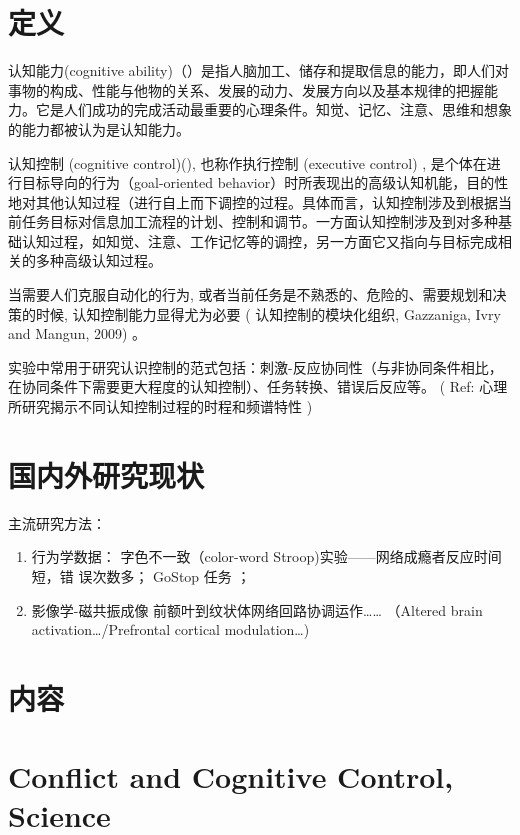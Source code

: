 \color{magenta}

\section{定义}
认知能力(cognitive ability)（\cite{}）是指人脑加工、储存和提取信息的能力，即人们对事物的构成、性能与他物的关系、发展的动力、发展方向以及基本规律的把握能力。它是人们成功的完成活动最重要的心理条件。知觉、记忆、注意、思维和想象的能力都被认为是认知能力。
                
 认知控制 (cognitive control)(\cite{}), 也称作执行控制 (executive control) , 是个体在进行目标导向的行为（goal-oriented behavior）时所表现出的高级认知机能，目的性地对其他认知过程（进行自上而下调控的过程。具体而言，认知控制涉及到根据当前任务目标对信息加工流程的计划、控制和调节。一方面认知控制涉及到对多种基础认知过程，如知觉、注意、工作记忆等的调控，另一方面它又指向与目标完成相关的多种高级认知过程。

当需要人们克服自动化的行为, 或者当前任务是不熟悉的、危险的、需要规划和决策的时候, 认知控制能力显得尤为必要 (\cite{Gazzanigaetal2009} 认知控制的模块化组织,  Gazzaniga, Ivry and Mangun, 2009) 。
	
实验中常用于研究认识控制的范式包括：刺激-反应协同性（与非协同条件相比，在协同条件下需要更大程度的认知控制）、任务转换、错误后反应等。   ( Ref: 心理所研究揭示不同认知控制过程的时程和频谱特性 \cite{})


  
  
  
\section{国内外研究现状}

主流研究方法：
\begin{enumerate}
\item 行为学数据：
	字色不一致（color-word Stroop)实验——网络成瘾者反应时间短，错	误次数多；
	 GoStop 任务 ；
\item 影像学-磁共振成像
	前额叶到纹状体网络回路协调运作……
	（Altered brain activation…/Prefrontal cortical modulation…)
\end{enumerate}


\section{内容}



\section*{Conflict and Cognitive Control, Science \cite{}}

